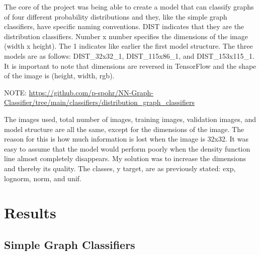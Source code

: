 \documentclass[12pt]{article}
\begin{document}
            The core of the project was being able to create a model that can classify graphs of four different probability distributions 
            and they, like the simple graph classifiers, have specific naming conventions. 
            DIST indicates that they are the distribution classifiers. Number x number specifies the dimensions of the image (width x height). 
            The 1 indicates like earlier the first model structure. The three models are as follows: 
            DIST\_32x32\_1, DIST\_115x86\_1, and DIST\_153x115\_1. It is important to note that dimensions are reversed in TensorFlow 
            and the shape of the image is (height, width, rgb).

            NOTE: \newline
            \url{https://github.com/p-spohr/NN-Graph-Classifier/tree/main/classifiers/distribution_graph_classifiers}
            
            The images used, total number of images, training images, validation images, 
            and model structure are all the same, except for the dimensions of the image. 
            The reason for this is how much information is lost when the image is 32x32. 
            It was easy to assume that the model would perform poorly when the density function line almost completely disappears. 
            My solution was to increase the dimensions and thereby its quality. 
            The classes, y target, are as previously stated: exp, lognorm, norm, and unif.
        
    \section{Results}
    
        \subsection{Simple Graph Classifiers}
\end{document}
